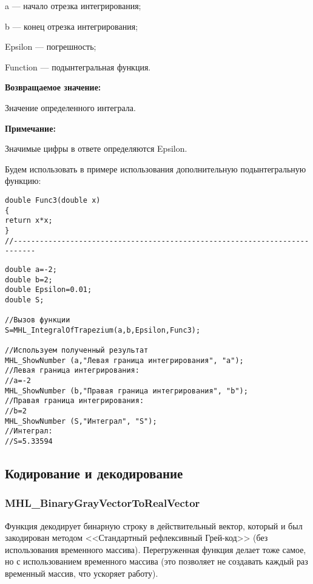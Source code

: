 \documentclass[a4paper,12pt]{article}
\begin{document}
 a --- начало отрезка интегрирования;
 
 b --- конец отрезка интегрирования;
 
 Epsilon --- погрешность;
 
 Function --- подынтегральная функция.

\textbf{Возвращаемое значение:}
 
 Значение определенного интеграла.
 
 \textbf{Примечание:}
 
 Значимые цифры в ответе определяются Epsilon.

Будем использовать в примере использования дополнительную подынтегральную функцию:

\begin{lstlisting}[caption=Дополнительная функция]
double Func3(double x)
{
return x*x;
}
//---------------------------------------------------------------------------
\end{lstlisting}


\begin{lstlisting}[label=code_use_MHL_IntegralOfTrapezium,caption=Пример использования]
double a=-2;
double b=2;
double Epsilon=0.01;
double S;

//Вызов функции
S=MHL_IntegralOfTrapezium(a,b,Epsilon,Func3);

//Используем полученный результат
MHL_ShowNumber (a,"Левая граница интегрирования", "a");
//Левая граница интегрирования:
//a=-2
MHL_ShowNumber (b,"Правая граница интегрирования", "b");
//Правая граница интегрирования:
//b=2
MHL_ShowNumber (S,"Интеграл", "S");
//Интеграл:
//S=5.33594
\end{lstlisting}

\subsection{Кодирование и декодирование}

\subsubsection{MHL\_BinaryGrayVectorToRealVector}\label{MHL_BinaryGrayVectorToRealVector}

Функция декодирует бинарную строку в действительный вектор, который и был закодирован методом <<Стандартный рефлексивный Грей-код>> (без использования временного массива). Перегруженная функция делает тоже самое, но с использованием временного массива (это позволяет не создавать каждый раз временный массив, что ускоряет работу).
\end{document}
